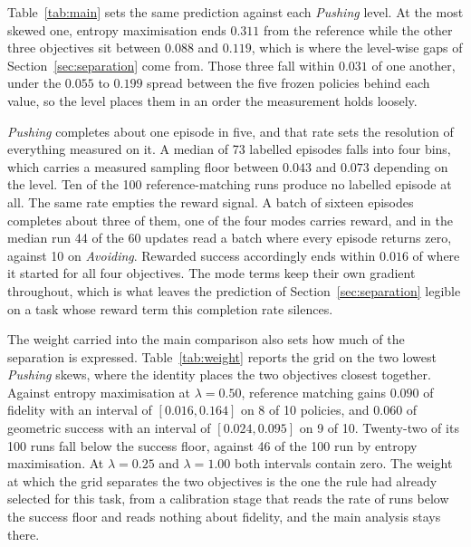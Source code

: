 \documentclass[preprint,12pt]{elsarticle}
\begin{document}
Table~\ref{tab:main} sets the same prediction against each \emph{Pushing}
level. At the most skewed one, entropy maximisation ends $0.311$ from the
reference while the other three objectives sit between $0.088$ and $0.119$,
which is where the level-wise gaps of Section~\ref{sec:separation} come from. Those
three fall within $0.031$ of one another, under the $0.055$ to $0.199$ spread
between the five frozen policies behind each value, so the level places them in
an order the measurement holds loosely.

\emph{Pushing} completes about one episode in five, and that rate sets the
resolution of everything measured on it. A median of 73 labelled episodes falls
into four bins, which carries a measured sampling floor between $0.043$ and
$0.073$ depending on the level. Ten of the 100 reference-matching runs produce
no labelled episode at all. The same rate empties the reward signal. A batch of
sixteen episodes completes about three of them, one of the four modes carries
reward, and in the median run 44 of the 60 updates read a batch where every
episode returns zero, against 10 on \emph{Avoiding}. Rewarded success
accordingly ends within $0.016$ of where it started for all four objectives.
The mode terms keep their own gradient throughout, which is what leaves the
prediction of Section~\ref{sec:separation} legible on a task whose reward term
this completion rate silences.

The weight carried into the main comparison also sets how much of the separation
is expressed. Table~\ref{tab:weight} reports the grid on the two lowest
\emph{Pushing} skews, where the identity places the two objectives closest
together. Against entropy maximisation at $\lambda = 0.50$, reference matching gains
$0.090$ of fidelity with an interval of $[0.016, 0.164]$ on 8 of 10 policies,
and $0.060$ of geometric success with an interval of $[0.024, 0.095]$ on 9 of
10. Twenty-two of its 100 runs fall below the success floor, against 46 of the
100 run by entropy maximisation. At $\lambda = 0.25$ and $\lambda = 1.00$ both
intervals contain zero. The weight at which the grid separates the two
objectives is the one the rule had already selected for this task, from a
calibration stage that reads the rate of runs below the success floor and
reads nothing about fidelity, and the main analysis stays there.
\end{document}
